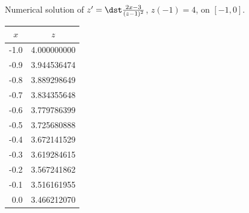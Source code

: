 \begin{examplesolution}
\begin{newtable}
  \label{table:3.3.5} Numerical solution of $z'=\dst\frac{2x-3}{(z-1)^{2}}$, $z(-1)=4$, on $[-1,0]$.
  \begin{center}
    \begin{tabular}{|r|r|}
      \hline
      \multicolumn{1}{|c|}{$x$} & \multicolumn{1}{|c|}{$z$} \\
      \hline
      -1.0                      & 4.000000000               \\
      -0.9                      & 3.944536474               \\
      -0.8                      & 3.889298649               \\
      -0.7                      & 3.834355648               \\
      -0.6                      & 3.779786399               \\
      -0.5                      & 3.725680888               \\
      -0.4                      & 3.672141529               \\
      -0.3                      & 3.619284615               \\
      -0.2                      & 3.567241862               \\
      -0.1                      & 3.516161955               \\
      0.0                       & 3.466212070               \\
      \hline
    \end{tabular}
  \end{center}
\end{newtable}


\end{examplesolution}
